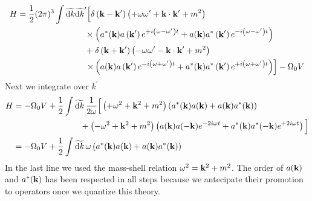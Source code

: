 \begin{equation}
    \begin{aligned}
H &=\frac{1}{2}(2 \pi)^{3} \int \widetilde{\dd k} \widetilde{\dd k}^{\prime}\Big{[}
\delta\left(\mathbf{k}-\mathbf{k}^{\prime}\right)\left(+\omega \omega^{\prime}+\mathbf{k} \cdot \mathbf{k}^{\prime}+m^{2}\right) \\
&\qquad\qquad\qquad\qquad\times\left(a^{*}(\mathbf{k}) a\left(\mathbf{k}^{\prime}\right) e^{+i\left(\omega-\omega^{\prime}\right) t}+a(\mathbf{k}) a^{*}\left(\mathbf{k}^{\prime}\right) e^{-i\left(\omega-\omega^{\prime}\right) t}\right) \\
&\qquad\qquad\qquad\qquad+\delta    \left(\mathbf{k}+\mathbf{k}^{\prime}\right)\left(-\omega \omega^{\prime}-\mathbf{k} \cdot \mathbf{k}^{\prime}+m^{2}\right) \\
&\qquad\qquad\qquad\qquad\left.\times\left(a(\mathbf{k}) a\left(\mathbf{k}^{\prime}\right) e^{-i\left(\omega+\omega^{\prime}\right) t}+a^{*}(\mathbf{k}) a^{*}\left(\mathbf{k}^{\prime}\right) e^{+i\left(\omega+\omega^{\prime}\right) t}\right)\right]-\Omega_{0} V
\end{aligned}
\end{equation}
Next we integrate over $k^\prime$
\begin{equation}
\begin{aligned}
H &=-\Omega_{0} V+\frac{1}{2} \int \widetilde{\dd k}\, \frac{1}{2 \omega}\Big{[}
\left(+\omega^{2}+\mathbf{k}^{2}+m^{2}\right)\left(a^{*}(\mathbf{k}) a(\mathbf{k})+a(\mathbf{k}) a^{*}(\mathbf{k})\right) \\
&\qquad\qquad\qquad\qquad+\left(-\omega^{2}+\mathbf{k}^{2}+m^{2}\right)\left(a(\mathbf{k}) a(-\mathbf{k}) e^{-2 i \omega t}+a^{*}(\mathbf{k}) a^{*}(-\mathbf{k}) e^{+2 i \omega t}\right)\Big{]}\\
&=-\Omega_{0} V+\frac{1}{2} \int \widetilde{\dd k}\, \omega\left(a^{*}(\mathbf{k}) a(\mathbf{k})+a(\mathbf{k}) a^{*}(\mathbf{k})\right) 
\end{aligned}
\label{hamilt_n_quant}
\end{equation}
In the last line we used the mass-shell relation $\omega^2=\vb{k}^2+m^2$. The order of $a(\vb{k})$ and $a^*(\vb{k})$ has been respected in all steps because we antecipate their promotion to operators once we quantize this theory.\\


